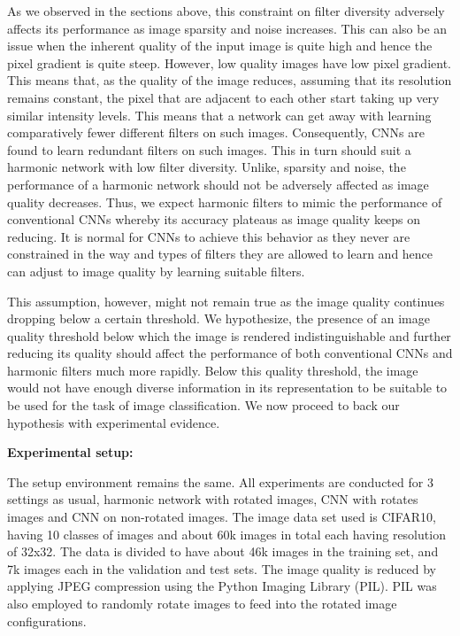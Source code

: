 \documentclass{article}
\begin{document}
As we observed in the sections above, this constraint on filter diversity adversely affects its performance as image sparsity and noise increases. This can also be an issue when the inherent quality of the input image is quite high and hence the pixel gradient is quite steep. However, low quality images have low pixel gradient. This means that, as the quality of the image reduces, assuming that its resolution remains constant, the pixel that are adjacent to each other start taking up very similar intensity levels. This means that a network can get away with learning comparatively fewer different filters on such images. Consequently, CNNs are found to learn redundant filters on such images. This in turn should suit a harmonic network with low filter diversity. Unlike, sparsity and noise, the performance of a harmonic network should not be adversely affected as image quality decreases. Thus, we expect harmonic filters to mimic the performance of conventional CNNs whereby its accuracy plateaus as image quality keeps on reducing. It is normal for CNNs to achieve this behavior as they never are constrained in the way and types of filters they are allowed to learn and hence can adjust to image quality by learning suitable filters.

This assumption, however, might not remain true as the image quality continues dropping below a certain threshold. We hypothesize, the presence of an image quality threshold below which the image is rendered indistinguishable and further reducing its quality should affect the performance of both conventional CNNs and harmonic filters much more rapidly. Below this quality threshold, the image would not have enough diverse information in its representation to be suitable to be used for the task of image classification. We now proceed to back our hypothesis with experimental evidence.

\textbf{Experimental setup:}
 
The setup environment remains the same. All experiments are conducted for 3 settings as usual, harmonic network with rotated images, CNN with rotates images and CNN on non-rotated images. The image data set used is CIFAR10, having 10 classes of images and about 60k images in total each having resolution of 32x32. The data is divided to have about 46k images in the training set, and 7k images each in the validation and test sets. The image quality is reduced by applying JPEG compression using the Python Imaging Library (PIL). PIL was also employed to randomly rotate images to feed into the rotated image configurations.
\end{document}
